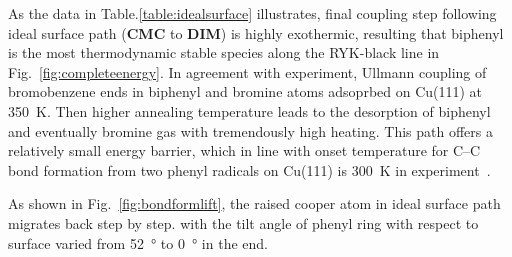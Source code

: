\documentclass[%
 reprint,
 amsmath,amssymb,
 aps,
prb,
floatfix,
]{revtex4-2}
\newcommand{\comm}{\color{Purple}} %
\begin{document}
{\color{blue}
As the data in Table.\ref{table:idealsurface} illustrates, final coupling step following ideal surface path (\textbf{CMC} to \textbf{DIM}) is highly exothermic, resulting that biphenyl is the most thermodynamic stable species along the RYK-black line in Fig.~\ref{fig:completeenergy}. In agreement with experiment, Ullmann coupling of bromobenzene ends in biphenyl and bromine atoms adsoprbed on Cu(111) at \SI{350}{\kelvin}\cite{ullmann_67}. Then higher annealing temperature leads to the desorption of biphenyl and eventually bromine gas with tremendously high heating.
This path offers a relatively small energy barrier, which in line with onset temperature for C--C bond formation from two phenyl radicals on Cu(111) is \SI{300}{\kelvin} in experiment~\cite{sur_sci01}.

As shown in Fig.~\ref{fig:bondformlift}, the raised cooper atom in ideal surface path migrates back step by step. with the tilt angle of phenyl ring with respect to surface varied from \SI{52}{\degree} to \SI{0}{\degree} in the end.
 

 
}
\end{document}
